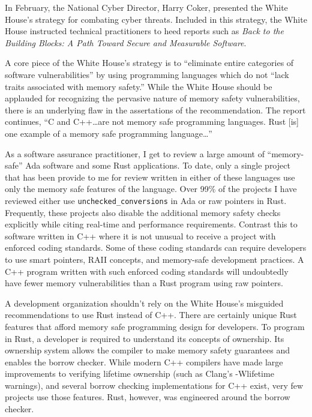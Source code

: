 In February, the National Cyber Director, Harry Coker, presented the White House's strategy for combating cyber threats. Included in this strategy, the White House instructed technical practitioners to heed reports such as \textit{Back to the Building Blocks: A Path Toward Secure and Measurable Software}.\autocite{20240902:coker}

A core piece of the White House's strategy is to ``eliminate entire categories of software vulnerabilities'' by using programming languages which do not ``lack traits associated with memory safety.''\autocite[\pno~7]{20240902:whitehouse} While the White House should be applauded for recognizing the pervasive nature of memory safety vulnerabilities, there is an underlying flaw in the assertations of the recommendation. The report continues, ``C and C++\ldots are not memory safe programming languages. Rust [is] one example of a memory safe programming language\ldots''\autocite[\pno~9]{20240902:whitehouse}

As a software assurance practitioner, I get to review a large amount of ``memory-safe'' Ada software and some Rust applications. To date, only a single project that has been provide to me for review written in either of these languages use only the memory safe features of the language. Over 99\% of the projects I have reviewed either use \texttt{unchecked\_conversions} in Ada\autocite{20240902:hood} or raw pointers in Rust. Frequently, these projects also disable the additional memory safety checks explicitly while citing real-time and performance requirements. Contrast this to software written in C++ where it is not unusual to receive a project with enforced coding standards. Some of these coding standards can require developers to use smart pointers, RAII concepts, and memory-safe development practices. A C++ program written with such enforced coding standards will undoubtedly have fewer memory vulnerabilities than a Rust program using raw pointers.

A development organization shouldn't rely on the White House's misguided recommendations to use Rust instead of C++. There are certainly unique Rust features that afford memory safe programming design for developers. To program in Rust, a developer is required to understand its concepts of ownership. Its ownership system allows the compiler to make memory safety guarantees and enables the borrow checker. While modern C++ compilers have made large improvements to verifying lifetime ownership (such as Clang's -Wlifetime warnings), and several borrow checking implementations for C++ exist, very few projects use those features. Rust, however, was engineered around the borrow checker.


